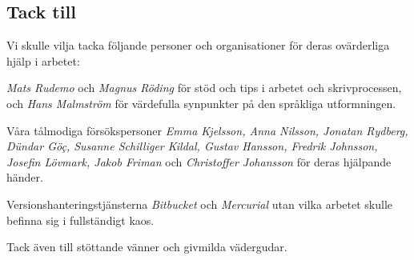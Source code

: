 \documentclass[../rapport_MVEX01-11-05]{subfiles}
\begin{document}

\subsection*{Tack till}
Vi skulle vilja tacka följande personer och organisationer för deras
ovärderliga hjälp i arbetet:

\begin{list}{}{\leftmargin=1em\rightmargin=1em}
\item \emph{Mats Rudemo} och \emph{Magnus Röding} för stöd och tips i arbetet
och skrivprocessen, och
\emph{Hans Malmström} för värdefulla synpunkter på den språkliga utformningen.

\item Våra tålmodiga försökspersoner \emph{Emma Kjelsson, Anna Nilsson,
Jonatan Rydberg, Dündar Göç, Susanne Schilliger Kildal, Gustav Hansson,
Fredrik Johnsson, Josefin Lövmark, Jakob Friman} och \emph{Christoffer
Johansson} för deras hjälpande händer.

\item Versionshanteringstjänsterna \emph{Bitbucket} och \emph{Mercurial} utan vilka
arbetet skulle befinna sig i fullständigt kaos.
\end{list}

Tack även till stöttande vänner och givmilda vädergudar.


    

%
%
%
%
\end{document}
